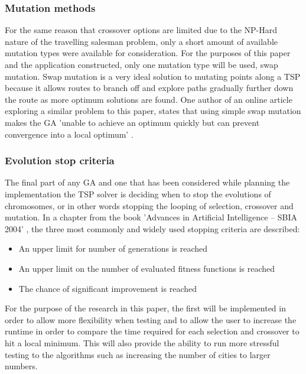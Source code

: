 \documentclass[article]{IEEEtran}
\begin{document}
\subsubsection{Mutation methods}
For the same reason that crossover options are limited due to the NP-Hard nature of the travelling salesman problem, only a short amount of available mutation types were available for consideration. For the purposes of this paper and the application constructed, only one mutation type will be used, swap mutation. Swap mutation is a very ideal solution to mutating points along a TSP because it allows routes to branch off and explore paths gradually further down the route as more optimum solutions are found. One author of an online article exploring a similar problem to this paper, states that using simple swap mutation makes the GA 'unable to achieve an optimum quickly but can prevent convergence into a local optimum' \cite{10}. \par

\subsubsection{Evolution stop criteria}
The final part of any GA and one that has been considered while planning the implementation the TSP solver is deciding when to stop the evolutions of chromosomes, or in other words stopping the looping of selection, crossover and mutation. In a chapter from the book 'Advances in Artificial Intelligence – SBIA 2004' \cite{11}, the three most commonly and widely used stopping criteria are described:
\begin{itemize}
\item An upper limit for number of generations is reached
\item An upper limit on the number of evaluated fitness functions is reached
\item The chance of significant improvement is reached
\end{itemize}
For the purpose of the research in this paper, the first will be implemented in order to allow more flexibility when testing and to allow the user to increase the runtime in order to compare the time required for each selection and crossover to hit a local minimum. This will also provide the ability to run more stressful testing to the algorithms such as increasing the number of cities to larger numbers.
\end{document}
